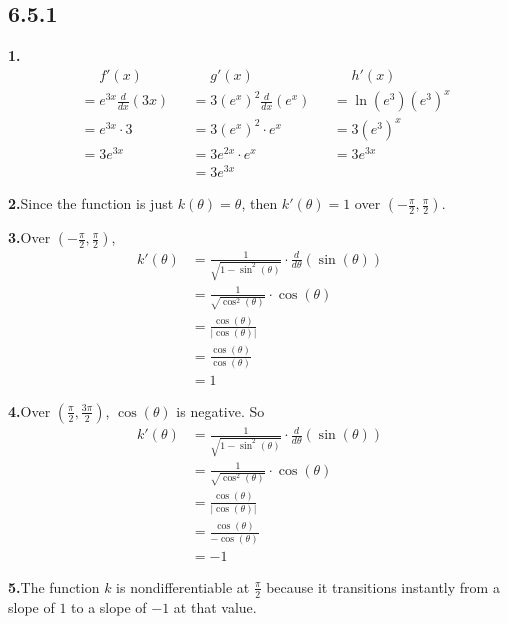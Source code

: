 \documentclass[10pt,oneside,]{book}
\theoremstyle{plain}
\theoremstyle{definition}
\numberwithin{equation}{section}
\newcommand{\fe}[2]{#1\mathopen{}\left(#2\right)\mathclose{}}
\newcommand{\ointerval}[2]{\left(#1,#2\right)}
\newcommand{\fd}[1]{#1'}
\newcommand{\lzoo}[2]{{\frac{d}{d#1}}{\left(#2\right)}}
\newcommand{\abs}[1]{\left|#1\right|}
\begin{document}
\subsection*{6.5.1 }
\noindent\textbf{1.}\quad{}\begin{align*}
&\phantom{{}={}}\fe{\fd{f}}{x}&&\phantom{{}={}}\fe{\fd{g}}{x}&&\phantom{{}={}}\fe{\fd{h}}{x}\\
&=e^{3x}\lzoo{x}{3x}&&=3\left(e^x\right)^2\lzoo{x}{e^x}&&=\fe{\ln}{e^3}\left(e^3\right)^x\\
&=e^{3x}\cdot3&&=3\left(e^x\right)^2\cdot e^x&&=3\left(e^3\right)^x\\
&=3e^{3x}&&=3e^{2x}\cdot e^x&&=3e^{3x}\\
&&&=3e^{3x}&&
\end{align*}%
\par\smallskip
\noindent\textbf{2.}\quad{}Since the function is just \(\fe{k}{\theta}=\theta\), then \(\fe{\fd{k}}{\theta}=1\) over \(\ointerval{-\frac{\pi}{2}}{\frac{\pi}{2}}\).%
\par\smallskip
\noindent\textbf{3.}\quad{}Over \(\ointerval{-\frac{\pi}{2}}{\frac{\pi}{2}}\),\begin{align*}
\fe{\fd{k}}{\theta}&=\frac{1}{\sqrt{1-\fe{\sin^2}{\theta}}}\cdot\lzoo{\theta}{\fe{\sin}{\theta}}\\
&=\frac{1}{\sqrt{\fe{\cos^2}{\theta}}}\cdot\fe{\cos}{\theta}\\
&=\frac{\fe{\cos}{\theta}}{\abs{\fe{\cos}{\theta}}}\\
&=\frac{\fe{\cos}{\theta}}{\fe{\cos}{\theta}}\\
&=1
\end{align*}%
\par\smallskip
\noindent\textbf{4.}\quad{}Over \(\ointerval{\frac{\pi}{2}}{\frac{3\pi}{2}}\), \(\fe{\cos}{\theta}\) is negative. So\begin{align*}
\fe{\fd{k}}{\theta}&=\frac{1}{\sqrt{1-\fe{\sin^2}{\theta}}}\cdot\lzoo{\theta}{\fe{\sin}{\theta}}\\
&=\frac{1}{\sqrt{\fe{\cos^2}{\theta}}}\cdot\fe{\cos}{\theta}\\
&=\frac{\fe{\cos}{\theta}}{\abs{\fe{\cos}{\theta}}}\\
&=\frac{\fe{\cos}{\theta}}{-\fe{\cos}{\theta}}\\
&=-1
\end{align*}%
\par\smallskip
\noindent\textbf{5.}\quad{}The function \(k\) is nondifferentiable at \(\frac{\pi}{2}\) because it transitions instantly from a slope of \(1\) to a slope of \(-1\) at that value.%
\end{document}
